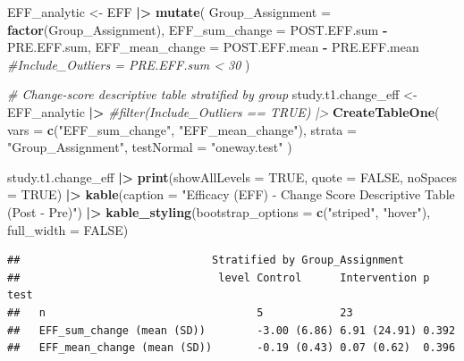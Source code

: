 \documentclass[
]{article}
\newenvironment{Shaded}{\begin{snugshade}}{\end{snugshade}}
\newcommand{\AttributeTok}[1]{\textcolor[rgb]{0.13,0.29,0.53}{#1}}
\newcommand{\CommentTok}[1]{\textcolor[rgb]{0.56,0.35,0.01}{\textit{#1}}}
\newcommand{\ConstantTok}[1]{\textcolor[rgb]{0.56,0.35,0.01}{#1}}
\newcommand{\FunctionTok}[1]{\textcolor[rgb]{0.13,0.29,0.53}{\textbf{#1}}}
\newcommand{\NormalTok}[1]{#1}
\newcommand{\OtherTok}[1]{\textcolor[rgb]{0.56,0.35,0.01}{#1}}
\newcommand{\SpecialCharTok}[1]{\textcolor[rgb]{0.81,0.36,0.00}{\textbf{#1}}}
\newcommand{\StringTok}[1]{\textcolor[rgb]{0.31,0.60,0.02}{#1}}
\begin{document}
\begin{Shaded}
\begin{Highlighting}[]
\NormalTok{EFF\_analytic }\OtherTok{\textless{}{-}}\NormalTok{ EFF }\SpecialCharTok{|\textgreater{}} 
  \FunctionTok{mutate}\NormalTok{(}
    \AttributeTok{Group\_Assignment =} \FunctionTok{factor}\NormalTok{(Group\_Assignment),}
    \AttributeTok{EFF\_sum\_change   =}\NormalTok{ POST.EFF.sum }\SpecialCharTok{{-}}\NormalTok{ PRE.EFF.sum,}
    \AttributeTok{EFF\_mean\_change  =}\NormalTok{ POST.EFF.mean }\SpecialCharTok{{-}}\NormalTok{ PRE.EFF.mean}
    \CommentTok{\#Include\_Outliers = PRE.EFF.sum \textless{} 30}
\NormalTok{  )}

\CommentTok{\# Change{-}score descriptive table stratified by group}
\NormalTok{study.t1.change\_eff }\OtherTok{\textless{}{-}}\NormalTok{ EFF\_analytic }\SpecialCharTok{|\textgreater{}} 
  \CommentTok{\#filter(Include\_Outliers == TRUE) |\textgreater{} }
  \FunctionTok{CreateTableOne}\NormalTok{(}
    \AttributeTok{vars =} \FunctionTok{c}\NormalTok{(}\StringTok{"EFF\_sum\_change"}\NormalTok{, }\StringTok{"EFF\_mean\_change"}\NormalTok{),}
    \AttributeTok{strata =} \StringTok{"Group\_Assignment"}\NormalTok{,}
    \AttributeTok{testNormal =} \StringTok{"oneway.test"}
\NormalTok{  )}

\NormalTok{study.t1.change\_eff }\SpecialCharTok{|\textgreater{}} 
  \FunctionTok{print}\NormalTok{(}\AttributeTok{showAllLevels =} \ConstantTok{TRUE}\NormalTok{, }\AttributeTok{quote =} \ConstantTok{FALSE}\NormalTok{, }\AttributeTok{noSpaces =} \ConstantTok{TRUE}\NormalTok{) }\SpecialCharTok{|\textgreater{}} 
  \FunctionTok{kable}\NormalTok{(}\AttributeTok{caption =} \StringTok{"Efficacy (EFF) {-} Change Score Descriptive Table (Post {-} Pre)"}\NormalTok{) }\SpecialCharTok{|\textgreater{}} 
  \FunctionTok{kable\_styling}\NormalTok{(}\AttributeTok{bootstrap\_options =} \FunctionTok{c}\NormalTok{(}\StringTok{"striped"}\NormalTok{, }\StringTok{"hover"}\NormalTok{), }\AttributeTok{full\_width =} \ConstantTok{FALSE}\NormalTok{)}
\end{Highlighting}
\end{Shaded}

\begin{verbatim}
##                              Stratified by Group_Assignment
##                               level Control      Intervention p     test
##   n                                 5            23                     
##   EFF_sum_change (mean (SD))        -3.00 (6.86) 6.91 (24.91) 0.392     
##   EFF_mean_change (mean (SD))       -0.19 (0.43) 0.07 (0.62)  0.396
\end{verbatim}
\end{document}
